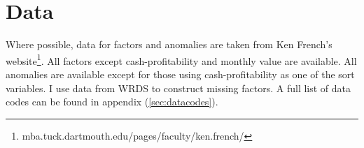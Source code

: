 
\section{Data}

Where possible, data for factors and anomalies are taken from Ken French's 
website\footnote{mba.tuck.dartmouth.edu/pages/faculty/ken.french/}.
All factors except cash-profitability and monthly value are available.
All anomalies are available except for those using cash-profitability as one of the sort 
variables.
I use data from WRDS to construct missing factors.
A full list of data codes can be found in appendix (\ref{sec:datacodes}).

